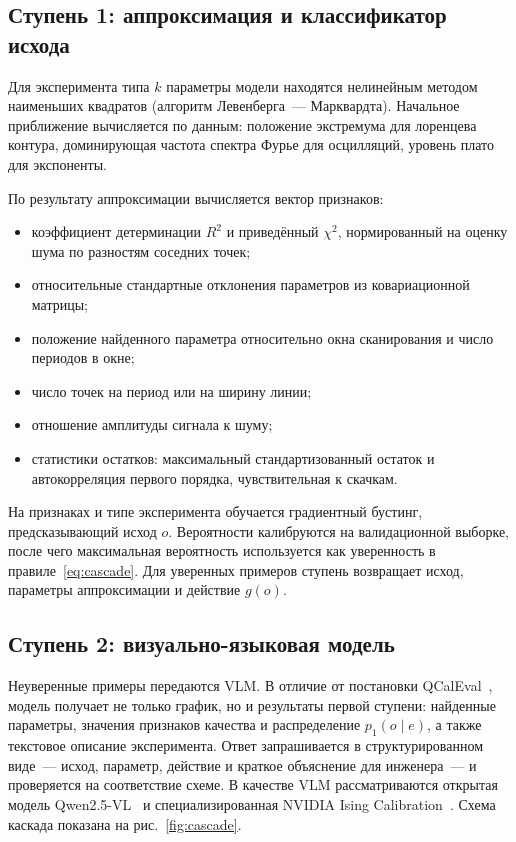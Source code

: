 \documentclass{misisarticle}
\begin{document}
\subsection{Ступень 1: аппроксимация и классификатор исхода}

Для эксперимента типа $k$ параметры модели находятся нелинейным методом наименьших квадратов (алгоритм Левенберга~--- Марквардта). Начальное приближение вычисляется по данным: положение экстремума для лоренцева контура, доминирующая частота спектра Фурье для осцилляций, уровень плато для экспоненты.

По результату аппроксимации вычисляется вектор признаков:
\begin{itemize}
  \item коэффициент детерминации $R^2$ и приведённый $\chi^2$, нормированный на оценку шума по разностям соседних точек;
  \item относительные стандартные отклонения параметров из ковариационной матрицы;
  \item положение найденного параметра относительно окна сканирования и число периодов в окне;
  \item число точек на период или на ширину линии;
  \item отношение амплитуды сигнала к шуму;
  \item статистики остатков: максимальный стандартизованный остаток и автокорреляция первого порядка, чувствительная к скачкам.
\end{itemize}

На признаках и типе эксперимента обучается градиентный бустинг, предсказывающий исход $o$. Вероятности калибруются на валидационной выборке, после чего максимальная вероятность используется как уверенность в правиле~\eqref{eq:cascade}. Для уверенных примеров ступень возвращает исход, параметры аппроксимации и действие $g(o)$.

\subsection{Ступень 2: визуально-языковая модель}

Неуверенные примеры передаются VLM. В отличие от постановки QCalEval~\cite{cao2026qcaleval}, модель получает не только график, но и результаты первой ступени: найденные параметры, значения признаков качества и распределение $p_1(o \mid e)$, а также текстовое описание эксперимента. Ответ запрашивается в структурированном виде~--- исход, параметр, действие и краткое объяснение для инженера~--- и проверяется на соответствие схеме. В качестве VLM рассматриваются открытая модель Qwen2.5-VL~\cite{bai2025qwen} и специализированная NVIDIA Ising Calibration~\cite{nvidia2026ising}. Схема каскада показана на рис.~\ref{fig:cascade}.
\end{document}
